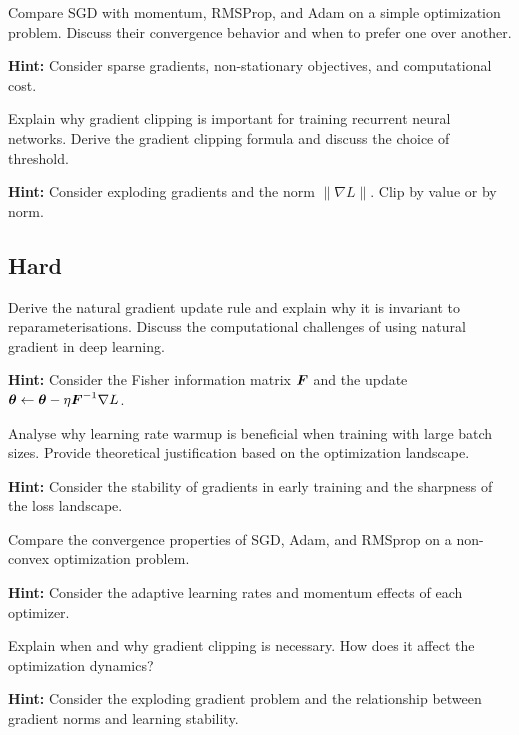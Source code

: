 \begin{problem}
Compare SGD with momentum, RMSProp, and Adam on a simple optimization problem. Discuss their convergence behavior and when to prefer one over another.

\textbf{Hint:} Consider sparse gradients, non-stationary objectives, and computational cost.
\end{problem}

\begin{problem}
Explain why gradient clipping is important for training recurrent neural networks. Derive the gradient clipping formula and discuss the choice of threshold.

\textbf{Hint:} Consider exploding gradients and the norm $\|\nabla L\|$. Clip by value or by norm.
\end{problem}

\subsection*{Hard}

\begin{problem}
Derive the natural gradient update rule and explain why it is invariant to reparameterisations. Discuss the computational challenges of using natural gradient in deep learning.

\textbf{Hint:} Consider the Fisher information matrix $\boldsymbol{F}$ and the update $\boldsymbol{\theta} \leftarrow \boldsymbol{\theta} - \eta \boldsymbol{F}^{-1} \nabla L$.
\end{problem}

\begin{problem}
Analyse why learning rate warmup is beneficial when training with large batch sizes. Provide theoretical justification based on the optimization landscape.

\textbf{Hint:} Consider the stability of gradients in early training and the sharpness of the loss landscape.
\end{problem}

\begin{problem}
Compare the convergence properties of SGD, Adam, and RMSprop on a non-convex optimization problem.

\textbf{Hint:} Consider the adaptive learning rates and momentum effects of each optimizer.
\end{problem}

\begin{problem}
Explain when and why gradient clipping is necessary. How does it affect the optimization dynamics?

\textbf{Hint:} Consider the exploding gradient problem and the relationship between gradient norms and learning stability.
\end{problem}

